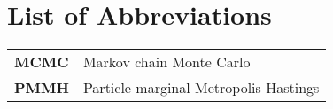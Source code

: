 \chapter{List of Abbreviations}
\begin{tabular}{ll}
\textbf{MCMC} & Markov chain Monte Carlo \\
\textbf{PMMH} & Particle marginal Metropolis Hastings \\
\end{tabular}
